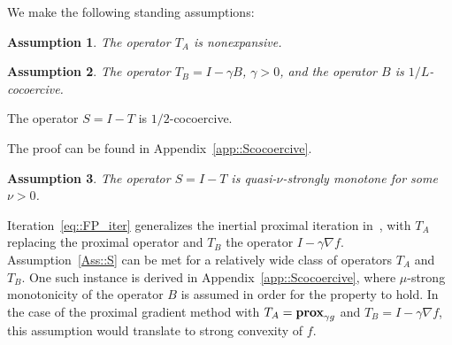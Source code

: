 \documentclass[envcountsect]{svjour3}
\newcommand{\ie}{{\it i.e.}}
\newcommand{\Hil}{{\mathcal{H} }}
\newcommand{\prox}{\operatorname{\bf prox}}
\newtheorem{assumption}{Assumption}
\begin{document}

We make the following standing assumptions:
\begin{assumption}{\label{Ass::propertiesA}}
The operator $T_A$ is nonexpansive.
\end{assumption}
\begin{assumption}{\label{Ass::propertiesB}}
The operator $T_B=I-\gamma B$, $\gamma>0$, and the operator $B$ is $1/L$-cocoercive.
\end{assumption}
\begin{corollary}\label{lem::Scocoercive}
The operator $S=I-T$ is $1/2$-cocoercive.
\end{corollary}
The proof can be found in Appendix~\ref{app::Scocoercive}.
\begin{assumption}{\label{Ass::S}}
The operator $S=I-T$ is quasi-$\nu$-strongly monotone for some $\nu>0$.
\end{assumption}
Iteration~\eqref{eq::FP_iter} generalizes the inertial proximal iteration in~\cite{ipiasco}, with $T_A$ replacing the proximal operator and $T_B$ the operator $I-\gamma\nabla f$.
Assumption~\ref{Ass::S} can be met for a relatively wide class of operators $T_A$ and $T_B$. One such instance is derived in Appendix~\ref{app::Scocoercive}, where $\mu$-strong monotonicity of the operator $B$ is assumed in order for the property to hold. In the case of the proximal gradient method with $T_A=\prox_{\gamma g}$ and $T_B=I-\gamma \nabla f$, this assumption would translate to strong convexity of $f$.
\end{document}
